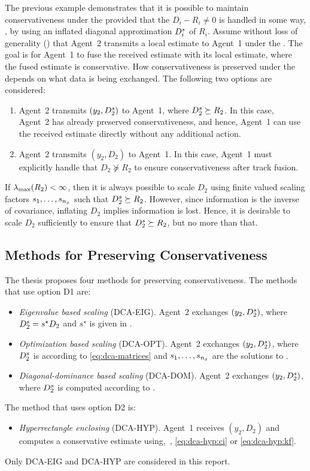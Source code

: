 The previous example demonstrates that it is possible to maintain conservativeness under the \abbrDCA provided that the $D_i-R_i\neq0$ is handled in some way, \eg, by using an inflated diagonal approximation $D^s_i$ of $R_i$. Assume without loss of generality (\wolog) that Agent~$2$ transmits a local estimate to Agent~1 under the \abbrDCA. The goal is for Agent~1 to fuse the received estimate with its local estimate, where the fused estimate is conservative. How conservativeness is preserved under the \abbrDCA depends on what data is being exchanged. The following two options are considered:
\begin{enumerate}[label=D\arabic*]
	\item Agent~2 transmits $(y_2,D^s_2)$ to Agent~1, where $D^s_2\succeq R_2$. In this case, Agent~2 has already preserved conservativeness, and hence, Agent~1 can use the received estimate directly without any additional action.
	\item Agent~2 transmits $(y_2,D_2)$ to Agent~1. In this case, Agent~1 must explicitly handle that $D_2\not\succeq R_2$ to ensure conservativeness after track fusion.
\end{enumerate}

If $\lambda_{\max}(R_2)<\infty$, then it is always possible to scale $D_2$ using finite valued scaling factors $s_1,\dots,s_{n_x}$ such that $D^s_2\succeq R_2$. However, since information is the inverse of covariance, inflating $D_2$ implies information is lost. Hence, it is desirable to scale $D_2$ sufficiently to ensure that $D^s_2\succeq R_2$, but no more than that.


\subsection{Methods for Preserving Conservativeness} \label{sec:dca:proposed-methods}

The thesis proposes four methods for preserving conservativeness. The methods that use option D1 are:
\begin{itemize}
	\item \emph{Eigenvalue based scaling} (DCA-EIG). Agent~2 exchanges $(y_2,D^s_2)$, where $D^s_2=s^\star D_2$ and $s^\star$ is given in \cite[Theorem~3.10]{Forsling2023Phd}.
	\item \emph{Optimization based scaling} (DCA-OPT). Agent~2 exchanges $(y_2,D^s_2)$, where $D^s_2$ is according to \eqref{eq:dca-matrices} and $s_1,\dots,s_{n_x}$ are the solutions to \cite[(3.36)]{Forsling2023Phd}.
	\item \emph{Diagonal-dominance based scaling} (DCA-DOM). Agent~2 exchanges $(y_2,D^s_2)$, where $D^s_2$ is computed according to \cite[(3.38)]{Forsling2023Phd}.
\end{itemize}
The method that uses option D2 is:
\begin{itemize}
	\item \emph{Hyperrectangle enclosing} (DCA-HYP). Agent~1 receives $(y_2,D_2)$ and computes a conservative estimate using, \eg, \eqref{eq:dca-hyp:ci} or \eqref{eq:dca-hyp:kf}.
\end{itemize}
Only DCA-EIG and DCA-HYP are considered in this report.




